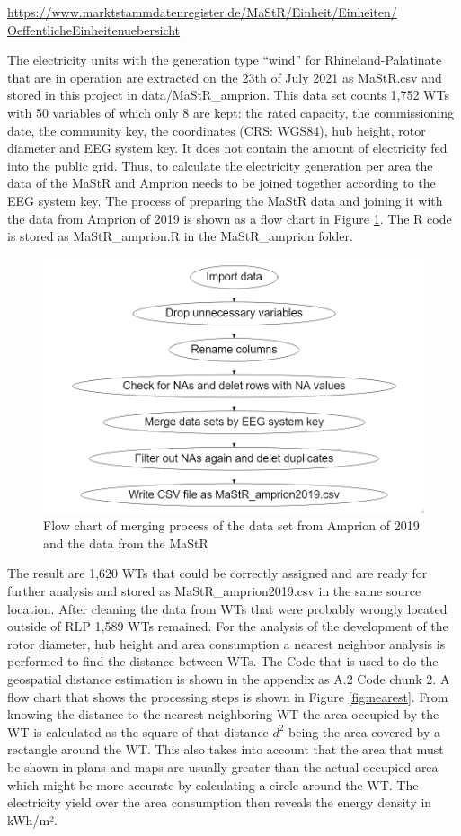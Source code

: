 \documentclass[a4paper,11pt]{article}
\begin{document}
\href{https://www.marktstammdatenregister.de/MaStR/Einheit/Einheiten/OeffentlicheEinheitenuebersicht}{https://www.marktstammdatenregister.de/MaStR/Einheit/Einheiten/
OeffentlicheEinheitenuebersicht}

The electricity units with the generation type ``wind'' for Rhineland-Palatinate that are in operation are extracted on the 23th of July 2021 as MaStR.csv and stored in this project in data/MaStR\_amprion. This data set counts 1,752 WTs with 50 variables of which only 8 are kept: the rated capacity, the commissioning date, the community key, the coordinates (CRS: WGS84), hub height, rotor diameter and EEG system key. It does not contain the amount of electricity fed into the public grid. Thus, to calculate the electricity generation per area the data of the MaStR and Amprion needs to be joined together according to the EEG system key. The process of preparing the MaStR data and joining it with the data from Amprion of 2019 is shown as a flow chart in Figure \ref{fig:merge}. The R code is stored as MaStR\_amprion.R in the MaStR\_amprion folder.
\begin{figure}[H]

{\centering \includegraphics[width=0.8\linewidth]{data/MaStR_amprion_join/mergeflow} 

}

\caption{Flow chart of merging process of the data set from Amprion of 2019 and the data from the MaStR}\label{fig:merge}
\end{figure}
The result are 1,620 WTs that could be correctly assigned and are ready for further analysis and stored as MaStR\_amprion2019.csv in the same source location. After cleaning the data from WTs that were probably wrongly located outside of RLP 1,589 WTs remained. For the analysis of the development of the rotor diameter, hub height and area consumption a nearest neighbor analysis is performed to find the distance between WTs. The Code that is used to do the geospatial distance estimation is shown in the appendix as A.2 Code chunk 2. A flow chart that shows the processing steps is shown in Figure \ref{fig:nearest}. From knowing the distance to the nearest neighboring WT the area occupied by the WT is calculated as the square of that distance \(d^2\) being the area covered by a rectangle around the WT. This also takes into account that the area that must be shown in plans and maps are usually greater than the actual occupied area which might be more accurate by calculating a circle around the WT. The electricity yield over the area consumption then reveals the energy density in kWh/m².
\end{document}

